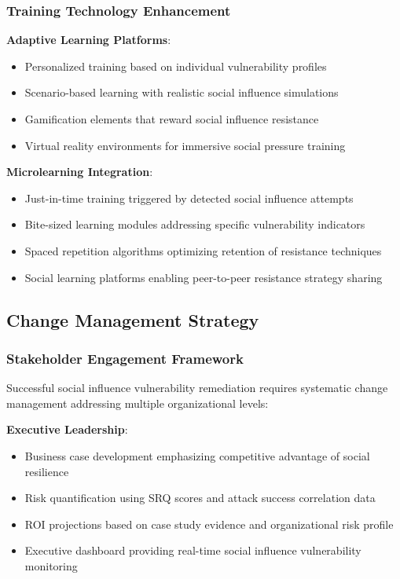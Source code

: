 \documentclass[11pt,a4paper]{article}
\begin{document}
\subsubsection{Training Technology Enhancement}

\textbf{Adaptive Learning Platforms}:
\begin{itemize}
\item Personalized training based on individual vulnerability profiles
\item Scenario-based learning with realistic social influence simulations
\item Gamification elements that reward social influence resistance
\item Virtual reality environments for immersive social pressure training
\end{itemize}

\textbf{Microlearning Integration}:
\begin{itemize}
\item Just-in-time training triggered by detected social influence attempts
\item Bite-sized learning modules addressing specific vulnerability indicators
\item Spaced repetition algorithms optimizing retention of resistance techniques
\item Social learning platforms enabling peer-to-peer resistance strategy sharing
\end{itemize}

\subsection{Change Management Strategy}

\subsubsection{Stakeholder Engagement Framework}

Successful social influence vulnerability remediation requires systematic change management addressing multiple organizational levels:

\textbf{Executive Leadership}:
\begin{itemize}
\item Business case development emphasizing competitive advantage of social resilience
\item Risk quantification using SRQ scores and attack success correlation data
\item ROI projections based on case study evidence and organizational risk profile
\item Executive dashboard providing real-time social influence vulnerability monitoring
\end{itemize}
\end{document}

